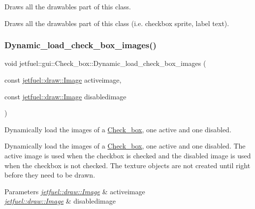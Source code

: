 Draws all the drawables part of this class. 

Draws all the drawables part of this class (i.\+e. checkbox sprite, label text). \mbox{\label{classjetfuel_1_1gui_1_1Check__box_a9fd8ee85ef4f17195fbb7bcf53e061dc}} 
\subsubsection{\texorpdfstring{Dynamic\+\_\+load\+\_\+check\+\_\+box\+\_\+images()}{Dynamic\_load\_check\_box\_images()}}
{\footnotesize\ttfamily void jetfuel\+::gui\+::\+Check\+\_\+box\+::\+Dynamic\+\_\+load\+\_\+check\+\_\+box\+\_\+images (\begin{DoxyParamCaption}\item[{const \hyperlink{classjetfuel_1_1draw_1_1Image}{jetfuel\+::draw\+::\+Image}}]{activeimage,  }\item[{const \hyperlink{classjetfuel_1_1draw_1_1Image}{jetfuel\+::draw\+::\+Image}}]{disabledimage }\end{DoxyParamCaption})\hspace{0.3cm}{\ttfamily [inline]}}



Dynamically load the images of a \hyperlink{classjetfuel_1_1gui_1_1Check__box}{Check\+\_\+box}, one active and one disabled. 

Dynamically load the images of a \hyperlink{classjetfuel_1_1gui_1_1Check__box}{Check\+\_\+box}, one active and one disabled. The active image is used when the checkbox is checked and the disabled image is used when the checkbox is not checked. The texture objects are not created until right before they need to be drawn.


\begin{DoxyParams}{Parameters}
{\em \hyperlink{classjetfuel_1_1draw_1_1Image}{jetfuel\+::draw\+::\+Image}} & activeimage \\
\hline
{\em \hyperlink{classjetfuel_1_1draw_1_1Image}{jetfuel\+::draw\+::\+Image}} & disabledimage \\
\hline
\end{DoxyParams}
\mbox{\label{classjetfuel_1_1gui_1_1Check__box_a6dbbadfa0e40212fd0d133ecd2924fa8}} 
